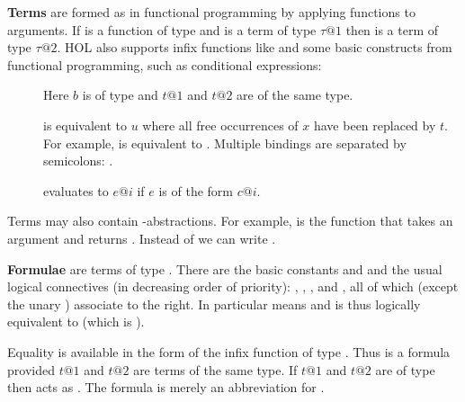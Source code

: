 \textbf{Terms} are formed as in functional programming by
applying functions to arguments. If  is a function of type
 and  is a term of type
$\tau@1$ then  is a term of type $\tau@2$. HOL also supports
infix functions like \isa{+} and some basic constructs from functional
programming, such as conditional expressions:
\begin{description}
\item[]
Here $b$ is of type  and $t@1$ and $t@2$ are of the same type.
\item[]
is equivalent to $u$ where all free occurrences of $x$ have been replaced by
$t$. For example,
 is equivalent to . Multiple bindings are separated
by semicolons: .
\item[]
evaluates to $e@i$ if $e$ is of the form $c@i$.
\end{description}

Terms may also contain
\isasymlambda-abstractions.
For example,
 is the function that takes an argument  and
returns . Instead of
 we can write
.%

%
\textbf{Formulae} are terms of type .
There are the basic constants  and  and
the usual logical connectives (in decreasing order of priority):
, ,
, and ,
all of which (except the unary \isasymnot) associate to the right. In
particular  means  and is thus logically equivalent to  (which is ).

Equality is available in the form of the infix function
\isa{=} of type . Thus  is a formula provided $t@1$
and $t@2$ are terms of the same type. If $t@1$ and $t@2$ are of type
 then \isa{=} acts as .
The formula
 is merely an abbreviation for
.

